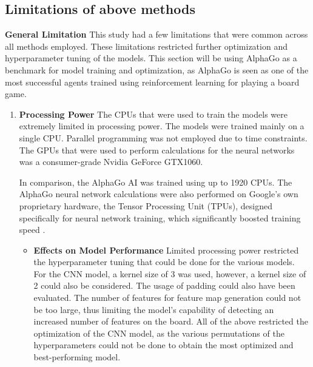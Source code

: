 \documentclass[a4paper,12pt,table]{article}
\begin{document}
\subsection{Limitations of above methods}

\textbf{General Limitation}
\newline
This study had a few limitations that were common across all methods employed. These limitations restricted further optimization and hyperparameter tuning of the models. This section will be using AlphaGo as a benchmark for model training and optimization, as AlphaGo is seen as one of the most successful agents trained using reinforcement learning for playing a board game. \par

\begin{enumerate}
    \item \textbf{Processing Power}
    \newline
    The CPUs that were used to train the models were extremely limited in processing power. The models were trained mainly on a single CPU. Parallel programming was not employed due to time constraints. The GPUs that were used to perform calculations for the neural networks was a consumer-grade Nvidia GeForce GTX1060. \par

    In comparison, the AlphaGo AI was trained using up to 1920 CPUs. The AlphaGo neural network calculations were also performed on Google’s own proprietary hardware, the Tensor Processing Unit (TPUs), designed specifically for neural network training, which significantly boosted training speed \cite{Mastering the game of Go with deep neural networks and tree search}. \par

    \begin{itemize}
        \item \textbf{Effects on Model Performance}
        \newline
        Limited processing power restricted the hyperparameter tuning that could be done for the various models. \\

        For the CNN model, a kernel size of 3 was used, however, a kernel size of 2 could also be considered. The usage of padding could also have been evaluated. The number of features for feature map generation could not be too large, thus limiting the model’s capability of detecting an increased number of features on the board. All of the above restricted the optimization of the CNN model, as the various permutations of the hyperparameters could not be done to obtain the most optimized and best-performing model. \\


\end{itemize}
\end{enumerate}
\end{document}
